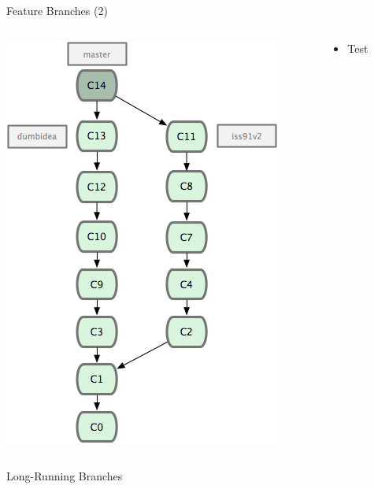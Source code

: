 \documentclass{beamer}
\begin{document}
\begin{frame}{Feature Branches (2)}
\begin{columns}[T]
  \begin{column}{.5\textwidth}
    \begin{block}{}
      \includegraphics[scale=0.6]{images/feature-branches2.png}
    \end{block}
  \end{column}
  \begin{column}{.5\textwidth}
    \begin{block}{}  
      \begin{itemize}
        \pause \item Test
      \end{itemize}
    \end{block}
  \end{column}
\end{columns}  

\end{frame}


\begin{frame}{Long-Running Branches}
\end{frame}
\end{document}
